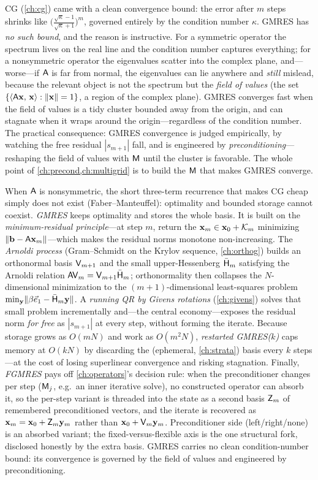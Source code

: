 CG (\cref{ch:cg}) came with a clean convergence bound: the error after $m$ steps
shrinks like $\bigl(\tfrac{\sqrt\kappa-1}{\sqrt\kappa+1}\bigr)^m$, governed entirely
by the condition number $\kappa$. GMRES has \emph{no such bound}, and the reason is
instructive. For a symmetric operator the spectrum lives on the real line and the
condition number captures everything; for a nonsymmetric operator the eigenvalues
scatter into the complex plane, and---worse---if $\mathsf{A}$ is far from normal, the
eigenvalues can lie anywhere and \emph{still} mislead, because the relevant object is
not the spectrum but the \emph{field of values} (the set $\{\left\langle \mathsf{A}\mathbf{x},\, \mathbf{x}\right\rangle:
\lVert\mathbf{x}\rVert=1\}$, a region of the complex plane). GMRES converges fast when the field
of values is a tidy cluster bounded away from the origin, and can stagnate when it
wraps around the origin---regardless of the condition number. The practical
consequence: GMRES convergence is judged empirically, by watching the free residual
$|s_{m+1}|$ fall, and is engineered by \emph{preconditioning}---reshaping the field of
values with $\mathsf{M}$ until the cluster is favorable. The whole point of
\cref{ch:precond,ch:multigrid} is to build the $\mathsf{M}$ that makes GMRES converge.

\summarysection
When $\mathsf{A}$ is nonsymmetric, the short three-term recurrence that makes CG cheap
simply does not exist (Faber--Manteuffel): optimality and bounded storage cannot
coexist. \emph{GMRES} keeps optimality and stores the whole basis. It is built on the
\emph{minimum-residual principle}---at step $m$, return the $\mathbf{x}_m\in\mathbf{x}_0+\mathcal{K}_m$
minimizing $\lVert\mathbf{b}-\mathsf{A}\mathbf{x}_m\rVert$---which makes the residual norms monotone
non-increasing. The \emph{Arnoldi process} (Gram--Schmidt on the Krylov sequence,
\cref{ch:orthog}) builds an orthonormal basis $\mathsf{V}_{m+1}$ and the small
upper-Hessenberg $\bar{\mathsf{H}}_m$ satisfying the Arnoldi relation
$\mathsf{A}\mathsf{V}_m=\mathsf{V}_{m+1}\bar{\mathsf{H}}_m$; orthonormality then collapses the
$N$-dimensional minimization to the $(m{+}1)$-dimensional least-squares problem
$\min_{\mathbf{y}}\lVert\beta\vec e_1-\bar{\mathsf{H}}_m\mathbf{y}\rVert$. A \emph{running QR by Givens
rotations} (\cref{ch:givens}) solves that small problem incrementally and---the central
economy---exposes the residual norm \emph{for free} as $|s_{m+1}|$ at every step,
without forming the iterate. Because storage grows as $O(mN)$ and work as $O(m^2N)$,
\emph{restarted GMRES($k$)} caps memory at $O(kN)$ by discarding the (ephemeral,
\cref{ch:strata}) basis every $k$ steps---at the cost of losing superlinear
convergence and risking stagnation. Finally, \emph{FGMRES} pays off \cref{ch:operators}'s
decision rule: when the preconditioner changes per step ($\mathsf{M}_j$, e.g.\ an inner
iterative solve), no constructed operator can absorb it, so the per-step variant is
threaded into the state as a second basis $\mathsf{Z}_m$ of remembered preconditioned
vectors, and the iterate is recovered as $\mathbf{x}_m=\mathbf{x}_0+\mathsf{Z}_m\mathbf{y}_m$ rather than
$\mathbf{x}_0+\mathsf{V}_m\mathbf{y}_m$. Preconditioner side (left/right/none) is an absorbed variant; the
fixed-versus-flexible axis is the one structural fork, disclosed honestly by the extra
basis. GMRES carries no clean condition-number bound: its convergence is governed by the
field of values and engineered by preconditioning.

